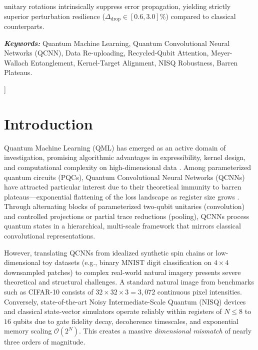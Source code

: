 \documentclass[10pt,twocolumn,twoside,a4paper]{article}
\begin{document}
{\begin{center}
\begin{minipage}{0.92\textwidth}
unitary rotations intrinsically suppress error propagation, yielding strictly superior perturbation resilience ($\Delta_{\text{drop}} \in [0.6, 3.0]$\%) compared to classical counterparts.
      \vspace{0.25cm}
      
      \noindent\textbf{\textit{Keywords:}} Quantum Machine Learning, Quantum Convolutional Neural Networks (QCNN), Data Re-uploading, Recycled-Qubit Attention, Meyer-Wallach Entanglement, Kernel-Target Alignment, NISQ Robustness, Barren Plateaus.
      \vspace{0.5cm}
    \end{minipage}
    \end{center}
}]

\section{Introduction}
\label{sec:introduction}

Quantum Machine Learning (QML) has emerged as an active domain of investigation, promising algorithmic advantages in expressibility, kernel design, and computational complexity on high-dimensional data \cite{biamonte2017quantum, cerezo2021variational}. Among parameterized quantum circuits (PQCs), Quantum Convolutional Neural Networks (QCNNs) \cite{cong2019quantum, hur2022quantum} have attracted particular interest due to their theoretical immunity to barren plateaus---exponential flattening of the loss landscape as register size grows \cite{mcclean2018barren, pesah2021absence}. Through alternating blocks of parameterized two-qubit unitaries (convolution) and controlled projections or partial trace reductions (pooling), QCNNs process quantum states in a hierarchical, multi-scale framework that mirrors classical convolutional representations.

However, translating QCNNs from idealized synthetic spin chains or low-dimensional toy datasets (e.g., binary MNIST digit classification on $4 \times 4$ downsampled patches) to complex real-world natural imagery presents severe theoretical and structural challenges. A standard natural image from benchmarks such as CIFAR-10 \cite{krizhevsky2009learning} consists of $32 \times 32 \times 3 = 3{,}072$ continuous pixel intensities. Conversely, state-of-the-art Noisy Intermediate-Scale Quantum (NISQ) devices \cite{preskill2018quantum} and classical state-vector simulators operate reliably within registers of $N \le 8$ to $16$ qubits due to gate fidelity decay, decoherence timescales, and exponential memory scaling $\mathcal{O}(2^N)$. This creates a massive \textit{dimensional mismatch} of nearly three orders of magnitude.
\end{document}
